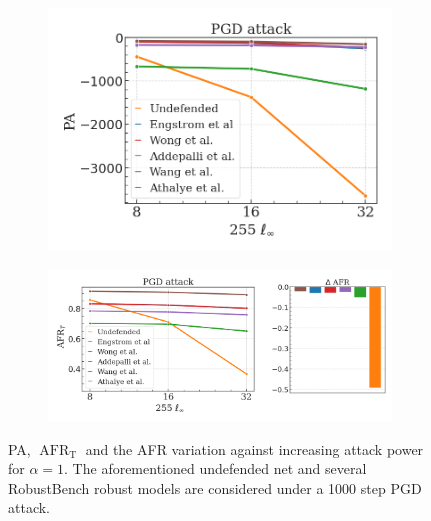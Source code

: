 \begin{figure}[H]
    \centering
    \begin{subfigure}[b]{0.37\textwidth}
        \centering
        \includegraphics[width=\textwidth]{img/results_discussion/adversarial/PGD_logPA_eps.png}
    \end{subfigure}
    \hfill
    \begin{subfigure}[b]{0.59\textwidth}
        \centering
        \includegraphics[width=\textwidth]{img/results_discussion/adversarial/PGD_AFR_true_eps_diff.png}
    \end{subfigure}
    \caption{PA, $\operatorname{AFR}_\text{T}$ and the AFR variation against increasing attack power for  $\alpha = 1$. 
    The aforementioned undefended net and several RobustBench robust models are considered
    under a 1000 step PGD attack.}
    \label{fig:pgd_eps}
\end{figure}

